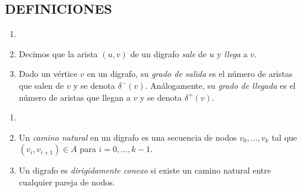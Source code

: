 \documentclass{amsart}
\begin{document}
\begin{large}
\newpage
\thispagestyle{plain}

\section*{DEFINICIONES}

\begin{defn}
    \begin{enumerate}
        \item[]
        \item Decimos que la arista $(u,v)$ de un digrafo \emph{sale} de $u$ y \emph{llega} a $v$.
        \item Dado un vértice $v$ en un digrafo, su \emph{grado de salida} es el número de aristas que salen de $v$ y se denota $\delta^-(v)$. Análogamente, su \emph{grado de llegada} es el número de aristas que llegan a $v$ y se denota $\delta^+(v)$.
    \end{enumerate}
\end{defn}

\begin{defn}
    \begin{enumerate}
        \item[]
        \item Un \emph{camino natural} en un digrafo es una secuencia de nodos $v_0,...,v_{k}$ tal que $(v_i, v_{i+1}) \in A$ para $i = 0,...,k-1$.
        \item Un digrafo es \emph{dirigidamente conexo} si existe un camino natural entre cualquier pareja de nodos.
    \end{enumerate}
\end{defn}

\end{large}
\end{document}
